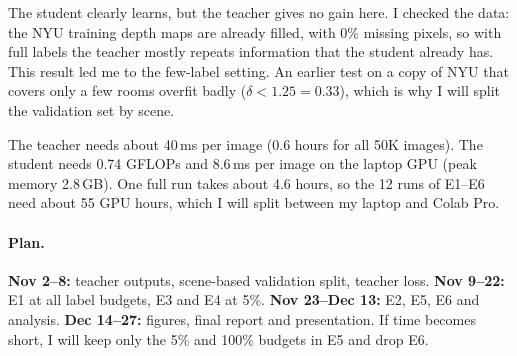 \documentclass[11pt]{article}
\begin{document}
The student clearly learns, but the teacher gives no gain here. I checked the
data: the NYU training depth maps are already filled, with 0\% missing pixels,
so with full labels the teacher mostly repeats information that the student
already has. This result led me to the few-label setting. An earlier test on a
copy of NYU that covers only a few rooms overfit badly ($\delta<1.25 = 0.33$),
which is why I will split the validation set by scene.

The teacher needs about 40\,ms per image (0.6 hours for all 50K images). The
student needs 0.74 GFLOPs and 8.6\,ms per image on the laptop GPU (peak memory
2.8\,GB). One full run takes about 4.6 hours, so the 12 runs of E1--E6 need
about 55 GPU hours, which I will split between my laptop and Colab Pro.

\paragraph{Plan.} \textbf{Nov 2--8:} teacher outputs, scene-based validation
split, teacher loss. \textbf{Nov 9--22:} E1 at all label budgets, E3 and E4 at
5\%. \textbf{Nov 23--Dec 13:} E2, E5, E6 and analysis. \textbf{Dec 14--27:}
figures, final report and presentation. If time becomes short, I will keep
only the 5\% and 100\% budgets in E5 and drop E6.
\end{document}
